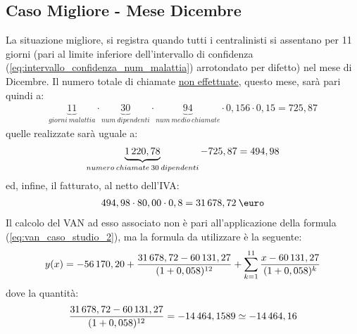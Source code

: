 \subsection[Caso Migliore - Mese Dicembre]{Caso Migliore - Mese Dicembre} 
La situazione migliore, si registra quando tutti i centralinisti si assentano per 11 giorni (pari al limite inferiore dell'intervallo di confidenza (\ref{eq:intervallo_confidenza_num_malattia}) arrotondato per difetto) nel mese di Dicembre. \newline
Il numero totale di chiamate \underline{non effettuate}, questo mese, sarà pari quindi a: 
	\begin{equation}
	\label{eq:totale_chiamate_non_effettuate_dicembre}
	\begin{split}
		\underbrace{11}_{giorni \: malattia} \cdot \underbrace{30}_{num\: dipendenti} \cdot \underbrace{94}_{num \: medio \: chiamate} \cdot 0,156 \cdot 0,15 = 725,87 
 	\end{split}
	\end{equation}
quelle realizzate sarà uguale a:
	\begin{equation}
	\label{eq:totale_chiamate_effettuate_dicembre}
	\begin{split}
		\underbrace{1\thinspace 220,78}_{numero\: chiamate \: 30 \: dipendenti} - 725,87 = 494,98
 	\end{split}
	\end{equation}
ed, infine, il fatturato, al netto dell'IVA:
	\begin{equation}
	\label{eq:fatturato_dicembre}
	\begin{split}
		494,98 \cdot 80,00 \cdot 0,8 = 31\thinspace 678,72 \: \mbox{\euro}
 	\end{split}
	\end{equation}
Il calcolo del VAN ad esso associato non è pari all'applicazione della formula (\ref{eq:van_caso_studio_2}), ma la formula da utilizzare è la seguente:
	\begin{equation}
	\label{eq:van_caso_dicembre}
	\begin{split}
		y(x) = -56\thinspace 170,20 + \frac{31\thinspace 678,72 - 60\thinspace 131,27}{(1+0,058)^{12}} + \sum_{k=1}^{11} \frac{x - 60\thinspace 131,27} {(1+0,058)^{k}}
 	\end{split}
	\end{equation}
dove la quantità:
	\begin{equation}
	\label{eq:attualizzazione_dicembre}
	\begin{split}
		\frac{31\thinspace 678,72 - 60\thinspace 131,27}{(1+0,058)^{12}} = -14\thinspace 464,1589 \simeq -14\thinspace 464,16
 	\end{split}
	\end{equation}
